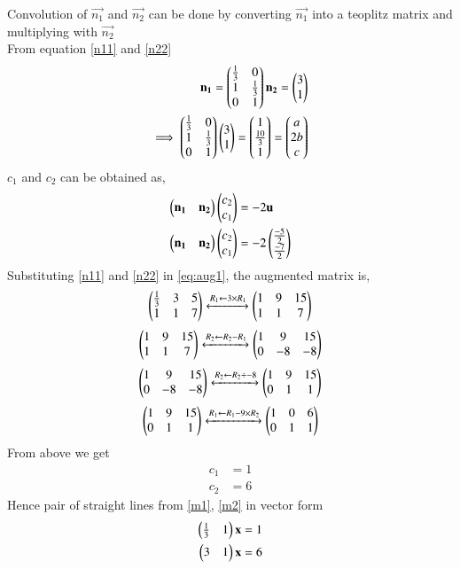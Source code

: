 \documentclass[journal,12pt,twocolumn]{IEEEtran}
\begin{document}
Convolution of $\vec{n_1}$ and $\vec{n_2}$ can be done by converting  $\vec{n_1}$ into a teoplitz matrix and multiplying with $\vec{n_2}$\\
From equation \eqref{n11} and \eqref{n22}
\begin{align}
    \mathbf{n_1}=\begin{pmatrix}\frac{1}{3}&0\\1&\frac{1}{3}\\0&1\end{pmatrix}
    \mathbf{n_2}=\begin{pmatrix}3\\ 1\end{pmatrix}\label{eq:conv2}\\
\implies \begin{pmatrix}\frac{1}{3}&0\\1&\frac{1}{3}\\0&1\end{pmatrix}\begin{pmatrix}3\\ 1\end{pmatrix} = \begin{pmatrix}1\\\frac{10}{3}\\1\end{pmatrix} = \begin{pmatrix}a\\2b\\c\end{pmatrix}\label{eq:conv3}
\end{align}
$c_1$ and $c_2$ can be obtained as,
\begin{align}
\begin{pmatrix}\mathbf{n_1} & \mathbf{n_2}\end{pmatrix}\begin{pmatrix}c_2\\c_1\end{pmatrix}&=-2\mathbf{u}\\
\begin{pmatrix}\mathbf{n_1} & \mathbf{n_2}\end{pmatrix}\begin{pmatrix}c_2\\c_1\end{pmatrix}&=-2\begin{pmatrix}\frac{-5}{2}\\\frac{-7}{2}\end{pmatrix}
\label{eq:aug1}
\end{align}
Substituting \eqref{n11} and \eqref{n22} in \eqref{eq:aug1}, the augmented matrix is,
\begin{align}
\begin{pmatrix}\frac{1}{3} & 3& 5 \\ 1 & 1 & 7\end{pmatrix}
\xleftrightarrow[]{R_1 \leftarrow 3\times R_1}
\begin{pmatrix}1 & 9&15\\ 1 & 1 & 7\end{pmatrix}
\end{align}
\begin{align}
\begin{pmatrix}1 & 9&15\\ 1 & 1 & 7\end{pmatrix}
\xleftrightarrow[]{R_2 \leftarrow R_2- R_1}
\begin{pmatrix}1 & 9&15\\ 0 & -8 & -8\end{pmatrix}
\end{align}
\begin{align}
\begin{pmatrix}1 & 9&15\\ 0 & -8 & -8\end{pmatrix}
\xleftrightarrow[]{R_2 \leftarrow R_2\div -8}
\begin{pmatrix}1 & 9&15\\ 0 & 1 & 1\end{pmatrix}
\end{align}
\begin{align}
\begin{pmatrix}1 & 9&15\\ 0 & 1 & 1\end{pmatrix}
\xleftrightarrow[]{R_1 \leftarrow R_1-9\times R_2}
\begin{pmatrix}1 & 0&6\\ 0 & 1&1 \end{pmatrix}
\end{align}
From above  we get 
\begin{align}
    c_1&=1\\
    c_2&=6
\end{align}
Hence pair of straight lines  from  \eqref{m1}, \eqref{m2} in vector form
\begin{align}
    \begin{pmatrix}\frac{1}{3}& 1\end{pmatrix}\mathbf{x}&=1\\
    \begin{pmatrix}3 & 1\end{pmatrix}\mathbf{x}&=6
\end{align}
\end{document}
